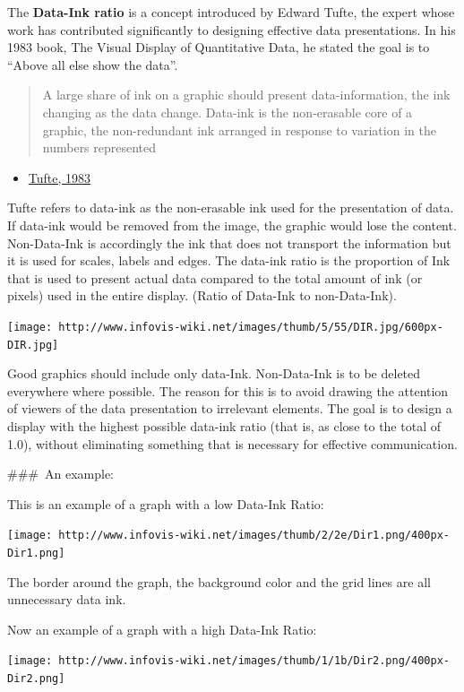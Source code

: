 \documentclass[]{book}
\providecommand{\tightlist}{%
  \setlength{\itemsep}{0pt}\setlength{\parskip}{0pt}}
\theoremstyle{definition}
\theoremstyle{definition}
\theoremstyle{definition}
\theoremstyle{remark}
\begin{document}
The \textbf{Data-Ink ratio} is a concept introduced by Edward Tufte, the
expert whose work has contributed significantly to designing effective
data presentations. In his 1983 book, The Visual Display of Quantitative
Data, he stated the goal is to ``Above all else show the data''.

\begin{quote}
A large share of ink on a graphic should present data-information, the
ink changing as the data change. Data-ink is the non-erasable core of a
graphic, the non-redundant ink arranged in response to variation in the
numbers represented
\end{quote}

\begin{itemize}
\tightlist
\item
  \href{https://www.edwardtufte.com/tufte/books_vdqi}{Tufte, 1983}
\end{itemize}

Tufte refers to data-ink as the non-erasable ink used for the
presentation of data. If data-ink would be removed from the image, the
graphic would lose the content. Non-Data-Ink is accordingly the ink that
does not transport the information but it is used for scales, labels and
edges. The data-ink ratio is the proportion of Ink that is used to
present actual data compared to the total amount of ink (or pixels) used
in the entire display. (Ratio of Data-Ink to non-Data-Ink).

\texttt{[image: http://www.infovis-wiki.net/images/thumb/5/55/DIR.jpg/600px-DIR.jpg]}

Good graphics should include only data-Ink. Non-Data-Ink is to be
deleted everywhere where possible. The reason for this is to avoid
drawing the attention of viewers of the data presentation to irrelevant
elements. The goal is to design a display with the highest possible
data-ink ratio (that is, as close to the total of 1.0), without
eliminating something that is necessary for effective communication.

\#\#\#~An example:

This is an example of a graph with a low Data-Ink Ratio:

\texttt{[image: http://www.infovis-wiki.net/images/thumb/2/2e/Dir1.png/400px-Dir1.png]}

The border around the graph, the background color and the grid lines are
all unnecessary data ink.

Now an example of a graph with a high Data-Ink Ratio:

\texttt{[image: http://www.infovis-wiki.net/images/thumb/1/1b/Dir2.png/400px-Dir2.png]}
\end{document}
